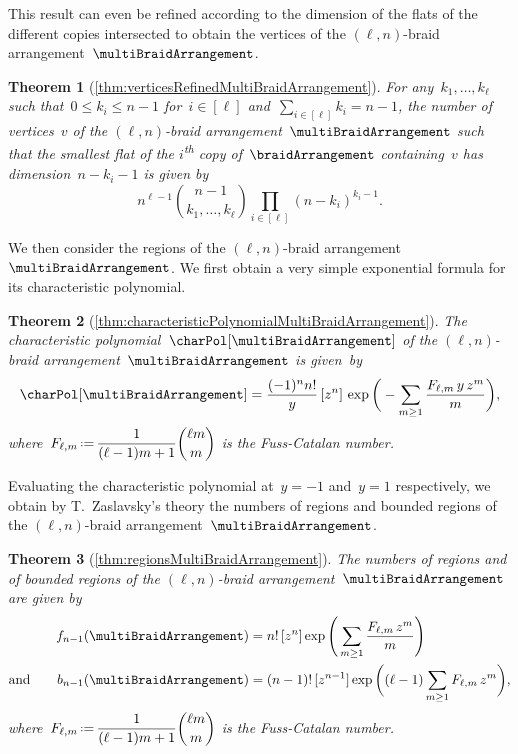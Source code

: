 \documentclass{amsart}
\newtheorem*{theorem*}{Theorem}
\theoremstyle{definition}
\newcommand{\eqdef}{\mbox{\,\raisebox{0.2ex}{\scriptsize\ensuremath{\mathrm:}}\ensuremath{=}\,}} %
\newcommand{\ordinal}{\textsuperscript{th}} %
\begin{document}
This result can even be refined according to the dimension of the flats of the different copies intersected to obtain the vertices of the $(\ell,n)$-braid arrangement~$\multiBraidArrangement$.

\begin{theorem*}[\cref{thm:verticesRefinedMultiBraidArrangement}]
For any~$k_1, \dots, k_\ell$ such that~$0 \le k_i \le n-1$ for~$i \in [\ell]$ and~${\sum_{i \in [\ell]} k_i = n-1}$, the number of vertices~$v$ of the $(\ell,n)$-braid arrangement~$\multiBraidArrangement$ such that the smallest flat of the $i$\ordinal{} copy of~$\braidArrangement$ containing~$v$ has dimension~$n-k_i-1$ is given by
\[
n^{\ell-1} \binom{n-1}{k_1, \dots, k_\ell} \prod_{i \in [\ell]} (n-k_i)^{k_i-1}.
\]
\end{theorem*}

We then consider the regions of the $(\ell,n)$-braid arrangement~$\multiBraidArrangement$.
We first obtain a very simple exponential formula for its characteristic polynomial.

\begin{theorem*}[\cref{thm:characteristicPolynomialMultiBraidArrangement}]
The characteristic polynomial~$\charPol[\multiBraidArrangement]$ of the $(\ell,n)$-braid arrangement~$\multiBraidArrangement$ is given~by
\[
\charPol[\multiBraidArrangement] = \frac{(-1)^n n!}{y} \, [z^n] \, \exp \bigg( - \sum_{m \ge 1} \frac{F_{\ell,m} \, y \, z^m}{m} \bigg) ,
\]
where~$\displaystyle F_{\ell,m} \eqdef \frac{1}{(\ell-1)m+1} \binom{\ell m}{m}$ is the Fuss-Catalan number.
\end{theorem*}

Evaluating the characteristic polynomial at~$y = -1$ and~$y = 1$ respectively, we obtain by T.~Zaslavsky's theory the numbers of regions and bounded regions of the $(\ell,n)$-braid arrangement~$\multiBraidArrangement$.

\begin{theorem*}[\cref{thm:regionsMultiBraidArrangement}]
The numbers of regions and of bounded regions of the $(\ell,n)$-braid arrangement~$\multiBraidArrangement$ are given by
\begin{align*}
f_{n-1}(\multiBraidArrangement) 
& = n! \, [z^n] \exp \Bigg( \sum_{m \ge 1} \frac{F_{\ell,m} \, z^m}{m} \Bigg) \\
\text{and}\qquad
b_{n-1}(\multiBraidArrangement)
& = (n-1)! \, [z^{n-1}] \exp \bigg( (\ell-1) \sum_{m \ge 1} F_{\ell,m} \, z^m \bigg),
\end{align*}
where~$\displaystyle F_{\ell,m} \eqdef \frac{1}{(\ell-1)m+1} \binom{\ell m}{m}$ is the Fuss-Catalan number.
\end{theorem*}
\end{document}
